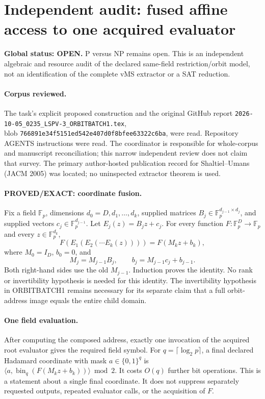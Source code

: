 \documentclass[11pt]{article}
\begin{document}
\section*{Independent audit: fused affine access to one acquired evaluator}
\textbf{Global status: OPEN.} P versus NP remains open. This is an independent
algebraic and resource audit of the declared same-field restriction/orbit
model, not an identification of the complete vMS extractor or a SAT reduction.

\paragraph{Corpus reviewed.}
The task's explicit proposed construction and the original GitHub report
\texttt{2026-10-05\_0235\_LSPV-3\_ORBITBATCH1.tex},\\ blob
\texttt{766891e34f5151ed542e407d0f8bfee63322c6ba}, were read.
Repository AGENTS instructions were read. The coordinator is responsible for
whole-corpus and manuscript reconciliation; this narrow independent review
does not claim that survey. The primary author-hosted publication record for
Shaltiel--Umans (JACM 2005) was located; no uninspected extractor theorem is used.

\paragraph{PROVED/EXACT: coordinate fusion.}
Fix a field $\mathbb F_p$, dimensions $d_0=D,d_1,\ldots,d_k$, supplied
matrices $B_j\in\mathbb F_p^{d_{j-1}\times d_j}$, and supplied vectors
$c_j\in\mathbb F_p^{d_{j-1}}$. Let $E_j(z)=B_jz+c_j$. For every function
$F:\mathbb F_p^D\to\mathbb F_p$ and every $z\in\mathbb F_p^{d_k}$,
\[
 F(E_1(E_2(\cdots E_k(z))))=F(M_kz+b_k),
\]
where $M_0=I_D$, $b_0=0$, and
\[
 M_j=M_{j-1}B_j,\qquad b_j=M_{j-1}c_j+b_{j-1}.
\]
Both right-hand sides use the old $M_{j-1}$. Induction proves the identity.
No rank or invertibility hypothesis is needed for this identity. The
invertibility hypothesis in ORBITBATCH1 remains necessary for its separate
claim that a full orbit-address image equals the entire child domain.

\paragraph{One field evaluation.}
After computing the composed address, exactly one invocation of the acquired
root evaluator gives the required field symbol. For $q=\lceil\log_2p\rceil$,
a final declared Hadamard coordinate with mask $a\in\{0,1\}^q$ is
$\langle a,\operatorname{bin}_q(F(M_kz+b_k))\rangle\bmod2$.
It costs $O(q)$ further bit operations. This is a statement about a single
final coordinate. It does not suppress separately requested outputs,
repeated evaluator calls, or the acquisition of $F$.
\end{document}
